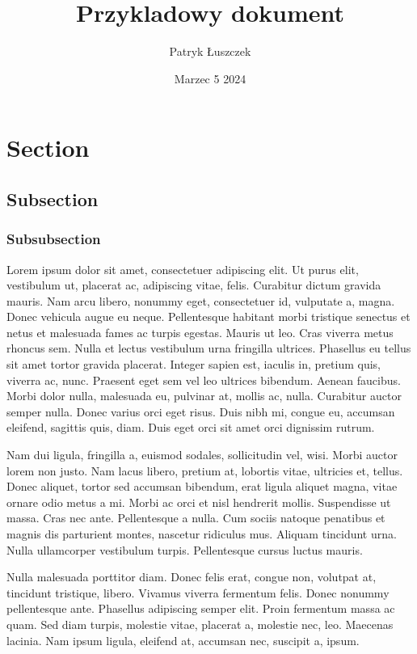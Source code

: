 \documentclass{article}
\title{Przykladowy dokument}
\author{Patryk Łuszczek}
\date{Marzec 5 2024}
\begin{document}
\maketitle

\tableofcontents
\section{Section}
\subsection{Subsection}
\subsubsection{Subsubsection}

Lorem ipsum dolor sit amet, consectetuer adipiscing elit. Ut purus elit, vestibulum ut, placerat ac, adipiscing vitae, felis. Curabitur dictum gravida mauris.
Nam arcu libero, nonummy eget, consectetuer id, vulputate a, magna. Donec
vehicula augue eu neque. Pellentesque habitant morbi tristique senectus et netus et malesuada fames ac turpis egestas. Mauris ut leo. Cras viverra metus
rhoncus sem. Nulla et lectus vestibulum urna fringilla ultrices. Phasellus eu tellus sit amet tortor gravida placerat. Integer sapien est, iaculis in, pretium quis,
viverra ac, nunc. Praesent eget sem vel leo ultrices bibendum. Aenean faucibus.
Morbi dolor nulla, malesuada eu, pulvinar at, mollis ac, nulla. Curabitur auctor
semper nulla. Donec varius orci eget risus. Duis nibh mi, congue eu, accumsan
eleifend, sagittis quis, diam. Duis eget orci sit amet orci dignissim rutrum.
\par
Nam dui ligula, fringilla a, euismod sodales, sollicitudin vel, wisi. Morbi
auctor lorem non justo. Nam lacus libero, pretium at, lobortis vitae, ultricies et,
tellus. Donec aliquet, tortor sed accumsan bibendum, erat ligula aliquet magna,
vitae ornare odio metus a mi. Morbi ac orci et nisl hendrerit mollis. Suspendisse
ut massa. Cras nec ante. Pellentesque a nulla. Cum sociis natoque penatibus et
magnis dis parturient montes, nascetur ridiculus mus. Aliquam tincidunt urna.
Nulla ullamcorper vestibulum turpis. Pellentesque cursus luctus mauris.
\par
Nulla malesuada porttitor diam. Donec felis erat, congue non, volutpat at,
tincidunt tristique, libero. Vivamus viverra fermentum felis. Donec nonummy
pellentesque ante. Phasellus adipiscing semper elit. Proin fermentum massa
ac quam. Sed diam turpis, molestie vitae, placerat a, molestie nec, leo. Maecenas lacinia. Nam ipsum ligula, eleifend at, accumsan nec, suscipit a, ipsum.
\end{document}
